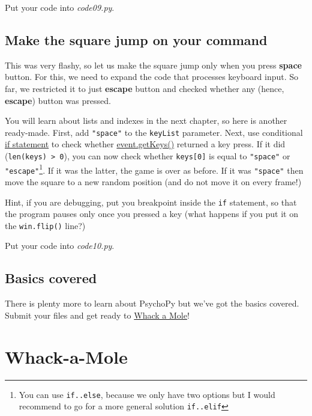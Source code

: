 \documentclass[
]{book}
\begin{document}
Put your code into \emph{code09.py}.

\hypertarget{make-the-square-jump-on-your-command}{%
\section{Make the square jump on your command}\label{make-the-square-jump-on-your-command}}

This was very flashy, so let us make the square jump only when you press \textbf{space} button. For this, we need to expand the code that processes keyboard input. So far, we restricted it to just \textbf{escape} button and checked whether any (hence, \textbf{escape}) button was pressed.

You will learn about lists and indexes in the next chapter, so here is another ready-made. First, add \texttt{"space"} to the \texttt{keyList} parameter. Next, use conditional \protect\hyperlink{ux5cux257Bux5cux23if-statement}{if statement} to check whether \href{https://psychopy.org/api/event.html\#psychopy.event.getKeys}{event.getKeys()} returned a key press. If it did (\texttt{len(keys)\ \textgreater{}\ 0}), you can now check whether \texttt{keys{[}0{]}} is equal to \texttt{"space"} or \texttt{"escape"}\footnote{You can use \texttt{if..else}, because we only have two options but I would recommend to go for a more general solution \texttt{if..elif}}. If it was the latter, the game is over as before. If it was \texttt{"space"} then move the square to a new random position (and do not move it on every frame!)

Hint, if you are debugging, put you breakpoint inside the \texttt{if} statement, so that the program pauses only once you pressed a key (what happens if you put it on the \texttt{win.flip()} line?)

Put your code into \emph{code10.py}.

\hypertarget{basics-covered}{%
\section{Basics covered}\label{basics-covered}}

There is plenty more to learn about PsychoPy but we've got the basics covered. Submit your files and get ready to \protect\hyperlink{whack-a-mole}{Whack a Mole}!

\hypertarget{whack-a-mole}{%
\chapter{Whack-a-Mole}\label{whack-a-mole}}
\end{document}
